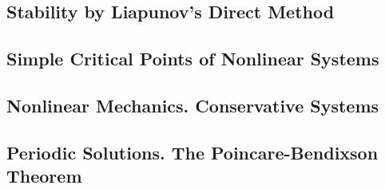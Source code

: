 \documentclass[12pt,a4paper]{article}
\begin{document}
\subsection{Stability by Liapunov's Direct Method}


\subsection{Simple Critical Points of Nonlinear Systems}


\subsection{Nonlinear Mechanics. Conservative Systems}



\subsection{Periodic Solutions. The Poincare-Bendixson Theorem}
\end{document}
